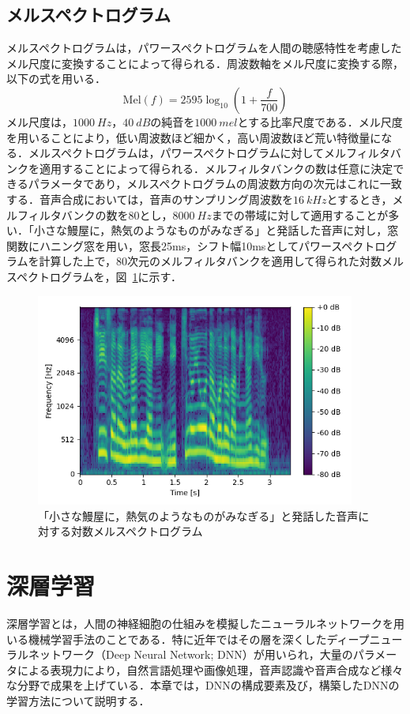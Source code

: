 \documentclass[12pt]{jarticle}
\numberwithin{equation}{section}    %
\numberwithin{figure}{section}      %
\numberwithin{table}{section}      %
\begin{document}
\subsection{メルスペクトログラム}
メルスペクトログラムは，パワースペクトログラムを人間の聴感特性を考慮したメル尺度に変換することによって得られる．周波数軸をメル尺度に変換する際，以下の式を用いる．
\begin{equation}
    \text{Mel}(f) = 2595\log_{10} \left(1 + \frac{f}{700}\right)
\end{equation}
メル尺度は，$\SI[]{1000}{Hz}$，$\SI[]{40}{dB}$の純音を$\SI[]{1000}{mel}$とする比率尺度である．メル尺度を用いることにより，低い周波数ほど細かく，高い周波数ほど荒い特徴量になる．メルスペクトログラムは，パワースペクトログラムに対してメルフィルタバンクを適用することによって得られる．メルフィルタバンクの数は任意に決定できるパラメータであり，メルスペクトログラムの周波数方向の次元はこれに一致する．音声合成においては，音声のサンプリング周波数を$\SI[]{16}{kHz}$とするとき，メルフィルタバンクの数を80とし，$\SI[]{8000}{Hz}$までの帯域に対して適用することが多い．「小さな鰻屋に，熱気のようなものがみなぎる」と発話した音声に対し，窓関数にハニング窓を用い，窓長25ms，シフト幅10msとしてパワースペクトログラムを計算した上で，80次元のメルフィルタバンクを適用して得られた対数メルスペクトログラムを，図~\ref{sec2:fig:melspectrogram}に示す．
\begin{figure}[bt]
    \centering
    \includegraphics[height=70mm]{./figure/sec2/melspectrogram.png}
    \caption{「小さな鰻屋に，熱気のようなものがみなぎる」と発話した音声に対する対数メルスペクトログラム}
    \label{sec2:fig:melspectrogram}
\end{figure}

\clearpage

\section{深層学習}
深層学習とは，人間の神経細胞の仕組みを模擬したニューラルネットワークを用いる機械学習手法のことである．特に近年ではその層を深くしたディープニューラルネットワーク（Deep Neural Network; DNN）が用いられ，大量のパラメータによる表現力により，自然言語処理や画像処理，音声認識や音声合成など様々な分野で成果を上げている．本章では，DNNの構成要素及び，構築したDNNの学習方法について説明する．
\end{document}
